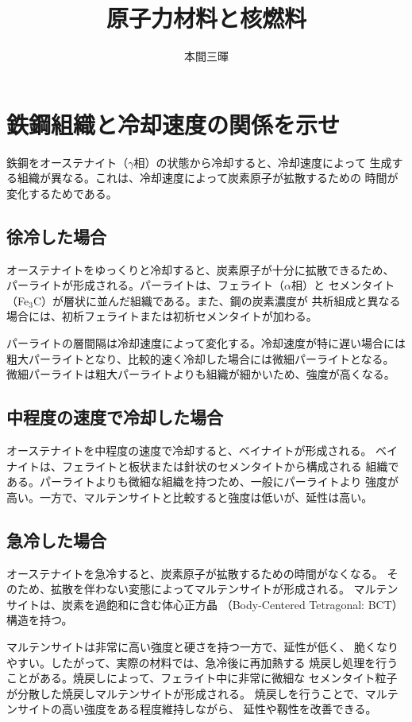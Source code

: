 \documentclass[titlepage,a4paper]{jsarticle}
\title{原子力材料と核燃料}
\author{本間三暉}
\begin{document}
\maketitle
\section{鉄鋼組織と冷却速度の関係を示せ}
鉄鋼をオーステナイト（$\gamma$相）の状態から冷却すると、冷却速度によって
生成する組織が異なる。これは、冷却速度によって炭素原子が拡散するための
時間が変化するためである。

\subsection{徐冷した場合}

オーステナイトをゆっくりと冷却すると、炭素原子が十分に拡散できるため、
パーライトが形成される。パーライトは、フェライト（$\alpha$相）と
セメンタイト（Fe$_3$C）が層状に並んだ組織である。また、鋼の炭素濃度が
共析組成と異なる場合には、初析フェライトまたは初析セメンタイトが加わる。

パーライトの層間隔は冷却速度によって変化する。冷却速度が特に遅い場合には
粗大パーライトとなり、比較的速く冷却した場合には微細パーライトとなる。
微細パーライトは粗大パーライトよりも組織が細かいため、強度が高くなる。

\subsection{中程度の速度で冷却した場合}

オーステナイトを中程度の速度で冷却すると、ベイナイトが形成される。
ベイナイトは、フェライトと板状または針状のセメンタイトから構成される
組織である。パーライトよりも微細な組織を持つため、一般にパーライトより
強度が高い。一方で、マルテンサイトと比較すると強度は低いが、延性は高い。

\subsection{急冷した場合}

オーステナイトを急冷すると、炭素原子が拡散するための時間がなくなる。
そのため、拡散を伴わない変態によってマルテンサイトが形成される。
マルテンサイトは、炭素を過飽和に含む体心正方晶
（Body-Centered Tetragonal: BCT）構造を持つ。

マルテンサイトは非常に高い強度と硬さを持つ一方で、延性が低く、
脆くなりやすい。したがって、実際の材料では、急冷後に再加熱する
焼戻し処理を行うことがある。焼戻しによって、フェライト中に非常に微細な
セメンタイト粒子が分散した焼戻しマルテンサイトが形成される。
焼戻しを行うことで、マルテンサイトの高い強度をある程度維持しながら、
延性や靱性を改善できる。
\end{document}
